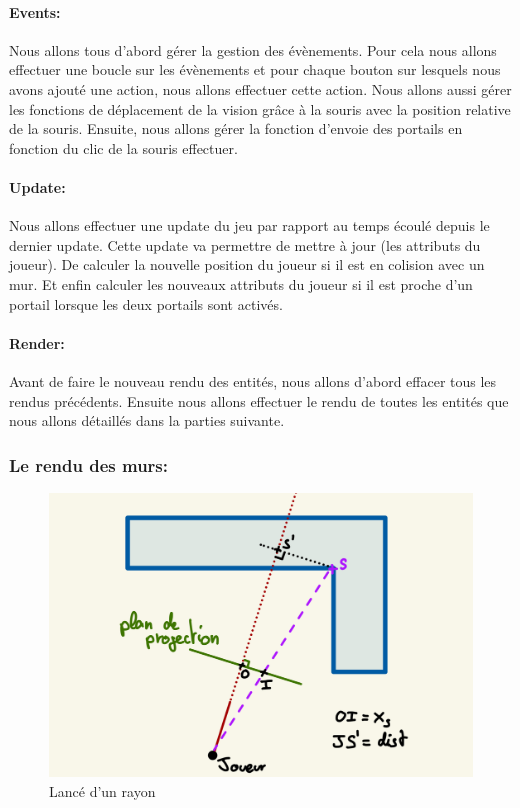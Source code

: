 \documentclass[11pt]{article}
\begin{document}
\paragraph{Events:}
Nous allons tous d'abord gérer la gestion des évènements. Pour cela nous allons effectuer une boucle sur les évènements et pour chaque bouton sur lesquels nous avons ajouté une action, nous allons effectuer cette action. Nous allons aussi gérer les fonctions de déplacement de la vision grâce à la souris avec la position relative de la souris. Ensuite, nous allons gérer la fonction d'envoie des portails en fonction du clic de la souris effectuer.

\paragraph{Update:}
Nous allons effectuer une update du jeu par rapport au temps écoulé depuis le dernier update. Cette update va permettre de mettre à jour (les attributs du joueur). De calculer la nouvelle position du joueur si il est en colision avec un mur. Et enfin calculer les nouveaux attributs du joueur si il est proche d'un portail lorsque les deux portails sont activés.

\paragraph{Render:}
Avant de faire le nouveau rendu des entités, nous allons d'abord effacer tous les rendus précédents. Ensuite nous allons effectuer le rendu de toutes les entités que nous allons détaillés dans la parties suivante.

\subsubsection{Le rendu des murs:}

\begin{figure}
	\begin{minipage}{\textwidth}
		\includegraphics[width=\linewidth]{image/shemaLanceRayon01.jpeg}
		\hspace*{-0.5cm}
		\caption{Lancé d'un rayon}
		\label{fig:shemaLanceRayon01}
	\end{minipage}
\end{figure}
\end{document}
